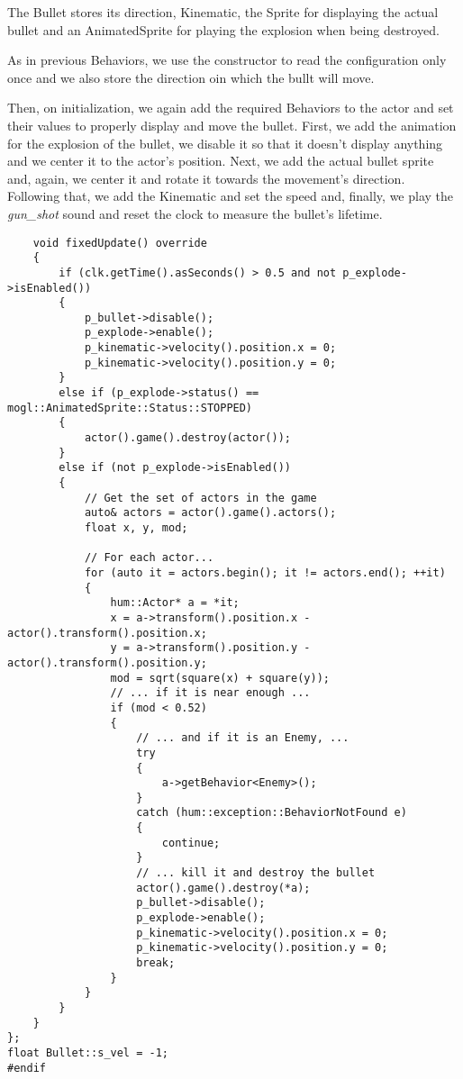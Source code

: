 The Bullet stores its direction, Kinematic, the Sprite for displaying the actual bullet and 
an AnimatedSprite for playing the explosion when being destroyed.

As in previous Behaviors, we use the constructor to read the configuration only once and 
we also store the direction oin which the bullt will move.

Then, on initialization, we again add the required Behaviors to the actor and set their values 
to properly display and move the bullet. First, we add the animation for the explosion of 
the bullet, we disable it so that it doesn't display anything and we center it to the actor's 
position. Next, we add the actual bullet sprite and, again, we center it and rotate it 
towards the movement's direction. Following that, we add the Kinematic and set the speed and, finally, 
we play the \textit{gun\_shot} sound and reset the clock to measure the bullet's lifetime.

\begin{lstlisting}
    void fixedUpdate() override
    {
        if (clk.getTime().asSeconds() > 0.5 and not p_explode->isEnabled())
        {
            p_bullet->disable();
            p_explode->enable();
            p_kinematic->velocity().position.x = 0;
            p_kinematic->velocity().position.y = 0;
        }
        else if (p_explode->status() == mogl::AnimatedSprite::Status::STOPPED)
        {
            actor().game().destroy(actor());
        }
        else if (not p_explode->isEnabled())
        {
            // Get the set of actors in the game
            auto& actors = actor().game().actors();
            float x, y, mod;

            // For each actor...
            for (auto it = actors.begin(); it != actors.end(); ++it)
            {
                hum::Actor* a = *it;
                x = a->transform().position.x - actor().transform().position.x;
                y = a->transform().position.y - actor().transform().position.y;
                mod = sqrt(square(x) + square(y));
                // ... if it is near enough ...
                if (mod < 0.52)
                {
                    // ... and if it is an Enemy, ...
                    try
                    {
                        a->getBehavior<Enemy>();
                    }
                    catch (hum::exception::BehaviorNotFound e)
                    {
                        continue;
                    }
                    // ... kill it and destroy the bullet
                    actor().game().destroy(*a);
                    p_bullet->disable();
                    p_explode->enable();
                    p_kinematic->velocity().position.x = 0;
                    p_kinematic->velocity().position.y = 0;
                    break;
                }
            }
        }
    }
};
float Bullet::s_vel = -1;
#endif
\end{lstlisting}

